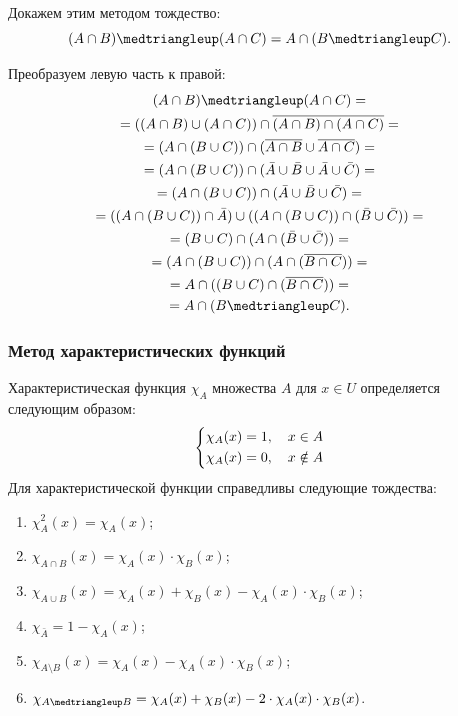 Докажем этим методом тождество:
\[
    (A \cap B) \symdiff (A \cap C) = A \cap (B \symdiff C).
\]

Преобразуем левую часть к правой:
\begin{gather*}
    (A \cap B) \symdiff (A \cap C) = \\ =
    ((A \cap B) \cup (A \cap C)) \cap \overline{(A \cap B) \cap (A \cap C)} = \\ =
    (A \cap (B \cup C)) \cap (\overline{A \cap B} \cup \overline{A \cap C}) = \\ =
    (A \cap (B \cup C)) \cap (\bar{A} \cup \bar{B} \cup \bar{A} \cup \bar{C}) = \\ =
    (A \cap (B \cup C)) \cap (\bar{A} \cup \bar{B} \cup \bar{C}) = \\ =
    ((A \cap (B \cup C)) \cap \bar{A}) \cup ((A \cap (B \cup C)) \cap (\bar{B} \cup \bar{C})) = \\ =
    (B \cup C) \cap (A \cap (\bar{B} \cup \bar{C})) = \\ =
    (A \cap (B \cup C)) \cap (A \cap (\overline{B \cap C})) = \\ =
    A \cap ((B \cup C) \cap (\overline{B \cap C})) = \\ =
    A \cap (B \symdiff C).
\end{gather*}

\subsubsection{Метод характеристических функций}

Характеристическая функция \(\chi_A\) множества \(A\) для \(x \in U\) определяется следующим образом:
\[
    \begin{dcases}
        \chi_A(x) = 1, \quad x \in A \\
        \chi_A(x) = 0, \quad x \notin A
    \end{dcases}
\]
Для характеристической функции справедливы следующие тождества:
\begin{enumerate}
    \item \(\chi_A^2(x) = \chi_A(x)\);
    \item \(\chi_{A \cap B}(x) = \chi_A(x) \cdot \chi_B(x)\);
    \item \(\chi_{A \cup B}(x) = \chi_A(x) + \chi_B(x) - \chi_A(x) \cdot \chi_B(x)\);
    \item \(\chi_{\bar{A}} = 1 - \chi_A(x)\);
    \item \(\chi_{A \setminus B}(x) = \chi_A(x) - \chi_A(x) \cdot \chi_B(x)\);
    \item \(\chi_{A \symdiff B} = \chi_A(x) + \chi_B(x) - 2 \cdot \chi_A(x) \cdot \chi_B(x)\).
\end{enumerate}

